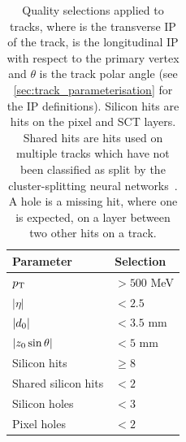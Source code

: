 \begin{table}[!htbp]
  \footnotesize\centering
  \setlength{\tabcolsep}{0.5em} %
  \begin{tabular}{ll}
    \toprule\hline
    \textbf{Parameter} & \textbf{Selection} \\
    \hline
    $p_{\text{T}}$                & $> 500$ MeV \\
    $|\eta|$             & $<2.5$ \\
    $|d_{0}|$           & $< 3.5$ mm \\
    $|z_{0}\sin\theta|$ & $< 5$ mm \\
    Silicon hits         & $\ge 8$ \\
    Shared silicon hits  & $< 2$ \\
    Silicon holes        & $< 3$ \\
    Pixel holes          & $< 2$ \\
    \hline\bottomrule
  \end{tabular}
  \caption{
    Quality selections applied to tracks,
    where \dzero is the transverse IP of the track, \zzero is the longitudinal IP with respect to the primary vertex and $\theta$ is the track polar angle (see \cref{sec:track_parameterisation} for the IP definitions).
    Silicon hits are hits on the pixel and SCT layers.
    Shared hits are hits used on multiple tracks which have not been classified as split by the cluster-splitting neural networks~\cite{PERF-2015-08}.
    A hole is a missing hit, where one is expected, on a layer between two other hits on a track.
    }%
  \vspace{4mm}
  \label{tab:fake_track_mva_selections}
\end{table}


